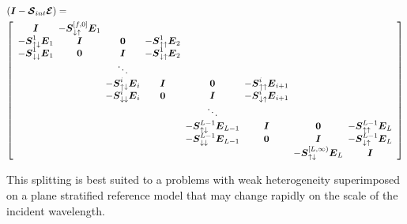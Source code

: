 \begin{samepage}
\begin{eqnarray} \label{mollref}
\lefteqn{ 
({\bmi  I}-{\CB  S}_{{int}}{\CB  E})=}\\
&&\!\!\!\!\!\!
\left[{\begin{array}{cccccccc}
 {\bmi  I}& \!\!\! -{\bmi  S}_{ \downarrow \uparrow }^{[f,0]}{\bmi  E}_{1}
 & \!\!\!& \!\!\!& \!\!\!& \!\!\!& \!\!\!& \!\!\!\\  
-{\bmi  S}_{\uparrow \downarrow }^{1}{\bmi  E}_{1}& \!\!\!  {\bmi  I}& \!\!\! {\bf 0}& \!\!\!
-{\bmi  S}_{ \uparrow \uparrow }^{1}{\bmi  E}_{2}& \!\!\!& \!\!\!& \!\!\!& \!\!\!\\  
-{\bmi  S}_{ \downarrow \downarrow }^{1}{\bmi  E}_{1}& \!\!\! {\bf 0}& \!\!\!
 {\bmi  I}& \!\!\!-{\bmi  S}_{ \downarrow \uparrow }^{1}
{\bmi  E}_{2}& \!\!\!& \!\!\!& \!\!\!& \!\!\!\\ \!\!\! 
& \!\!\!& \!\!\!\ddots& \!\!\!& \!\!\!& \!\!\!& \!\!\!& \!\!\!\\ \!\!\! 
& \!\!\!& \!\!\!-{\bmi  S}_{ \uparrow \downarrow }^{i}{\bmi  E}_{i}& \!\!\!
 {\bmi  I}& \!\!\!{\bf 0}& \!\!\!-{\bmi  S}_{ \uparrow \uparrow }^{i}{\bmi  E}_{i+1}& \!\!\!& \!\!\!\\ \!\!\! 
& \!\!\!& \!\!\! -{\bmi  S}_{ \downarrow \downarrow}^{i}{\bmi  E}_{i}& \!\!\!{\bf 0}& \!\!\!{\bmi  I}& \!\!\!
-{\bmi  S}_{ \downarrow \uparrow }^{i}{\bmi  E}_{i+1}& \!\!\!& \!\!\!\\ \!\!\! 
& \!\!\!& \!\!\!& \!\!\!& \!\!\! \ddots& \!\!\!& \!\!\!& \!\!\!\\ \!\!\! 
& \!\!\!& \!\!\!& \!\!\!& \!\!\!-{\bmi  S}_{ \uparrow \downarrow }^{L-1}{\bmi  E}_{L-1}& \!\!\!{\bmi 
I}& \!\!\! {\bf 0}& \!\!\! -{\bmi  S}_{ \uparrow \uparrow }^{L-1}{\bmi  E}_{L}\\ \!\!\! 
& \!\!\!& \!\!\!& \!\!\!& \!\!\! -{\bmi  S}_{ \downarrow \downarrow}^{L-1}{\bmi  E}_{L-1}& \!\!\! 
{\bf 0}& \!\!\! {\bmi  I}& \!\!\!
 -{\bmi  S}_{ \downarrow \uparrow }^{L-1}{\bmi  E}_{L}\\ \!\!\! 
& \!\!\!& \!\!\!& \!\!\!& \!\!\!& \!\!\!& \!\!\!  -{\bmi  S}_{ \uparrow 
\downarrow}^{[L,\infty)}{\bmi  E}_{L}& \!\!\!
 {\bmi  I}\end{array}}\right] \nonumber
\end{eqnarray}
\end{samepage}
This splitting is best suited to a problems with weak heterogeneity 
superimposed on a plane stratified  reference model that may change rapidly 
on the scale of the incident wavelength.


